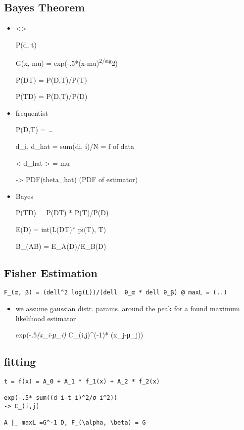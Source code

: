 \subsection{Bayes Theorem}\label{bayes-theorem}

\begin{itemize}
\item
  \textless{}\textgreater{}

  P(d, t)

  G(x, mu) = exp(-.5*(x-mu)\textsuperscript{2/sig}2)

  P(D\textbar{}T) = P(D,T)/P(T)

  P(T\textbar{}D) = P(D,T)/P(D)
\item
  frequentist

  P(D,T) = \ldots{}

  d\_i, d\_hat = sum(di, i)/N = f of data

  \textless{} d\_hat \textgreater{} = mu

  -\textgreater{} PDF(theta\_hat) (PDF of estimator)
\item
  Bayes

  P(T\textbar{}D) = P(D\textbar{}T) * P(T)/P(D)

  E(D) = int(L(D\textbar{}T)* pi(T), T)

  B\_(AB) = E\_A(D)/E\_B(D)
\end{itemize}

\subsection{Fisher Estimation}\label{fisher-estimation}

\begin{verbatim}
F_(α, β) = (dell^2 log(L))/(dell  θ_α * dell θ_β) @ maxL = (..)
\end{verbatim}

\begin{itemize}
\item
  we assume gaussian distr. params. around the peak for a found maximum
  likelihood estimator

  exp(-.5\emph{(x\_i-μ\_i)} C\_(i,j)\^{}(-1)* (x\_j-μ\_j))
\end{itemize}

\subsection{fitting}\label{fitting}

\begin{verbatim}
t = f(x) = A_0 + A_1 * f_1(x) + A_2 * f_2(x)

exp(-.5* sum((d_i-t_i)^2/σ_i^2))
-> C_(i,j)

A |_ maxL =G^-1 D, F_(\alpha, \beta) = G
\end{verbatim}
